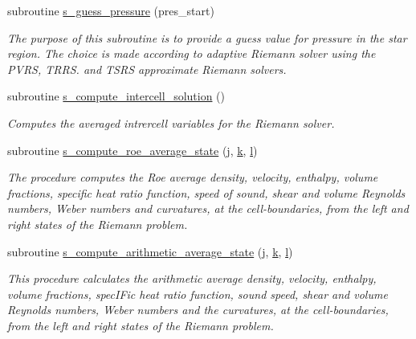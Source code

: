 \begin{DoxyCompactItemize}
subroutine \hyperlink{namespacem__riemann__solvers_a7e533d9eadb12af316d72f1b722735d8}{s\+\_\+guess\+\_\+pressure} (pres\+\_\+start)
\begin{DoxyCompactList}\small\item\em The purpose of this subroutine is to provide a guess value for pressure in the star region. The choice is made according to adaptive Riemann solver using the P\+V\+RS, T\+R\+RS. and T\+S\+RS approximate Riemann solvers. \end{DoxyCompactList}\item 
subroutine \hyperlink{namespacem__riemann__solvers_a68651027acd974568fd5f94ed39c8e82}{s\+\_\+compute\+\_\+intercell\+\_\+solution} ()
\begin{DoxyCompactList}\small\item\em Computes the averaged intrercell variables for the Riemann solver. \end{DoxyCompactList}\item 
subroutine \hyperlink{namespacem__riemann__solvers_aeeea1cc689aa550f3c1f182fe33a4939}{s\+\_\+compute\+\_\+roe\+\_\+average\+\_\+state} (\hyperlink{m__rhs_8f90_aeadbc0ce9b66517f8fde156199772ec1}{j}, \hyperlink{m__rhs_8f90_af22c486581933c52df7d4aa306382074}{k}, \hyperlink{m__rhs_8f90_a2ac747380de0e6e5e11b01f4137fb75c}{l})
\begin{DoxyCompactList}\small\item\em The procedure computes the Roe average density, velocity, enthalpy, volume fractions, specific heat ratio function, speed of sound, shear and volume Reynolds numbers, Weber numbers and curvatures, at the cell-\/boundaries, from the left and right states of the Riemann problem. \end{DoxyCompactList}\item 
subroutine \hyperlink{namespacem__riemann__solvers_a14b6f4fa2f3b1d567a3f3347105ce61e}{s\+\_\+compute\+\_\+arithmetic\+\_\+average\+\_\+state} (\hyperlink{m__rhs_8f90_aeadbc0ce9b66517f8fde156199772ec1}{j}, \hyperlink{m__rhs_8f90_af22c486581933c52df7d4aa306382074}{k}, \hyperlink{m__rhs_8f90_a2ac747380de0e6e5e11b01f4137fb75c}{l})
\begin{DoxyCompactList}\small\item\em This procedure calculates the arithmetic average density, velocity, enthalpy, volume fractions, spec\+I\+Fic heat ratio function, sound speed, shear and volume Reynolds numbers, Weber numbers and the curvatures, at the cell-\/boundaries, from the left and right states of the Riemann problem. \end{DoxyCompactList}\item 

\end{DoxyCompactItemize}
